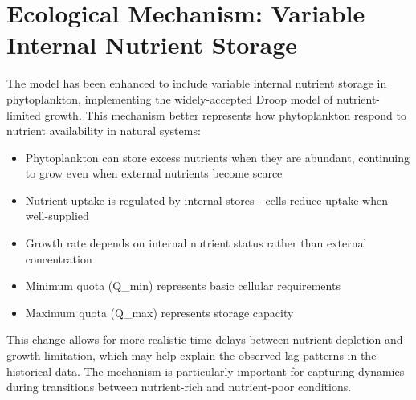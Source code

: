 \section{Ecological Mechanism: Variable Internal Nutrient Storage}

The model has been enhanced to include variable internal nutrient storage in phytoplankton, implementing the widely-accepted Droop model of nutrient-limited growth. This mechanism better represents how phytoplankton respond to nutrient availability in natural systems:

\begin{itemize}
    \item Phytoplankton can store excess nutrients when they are abundant, continuing to grow even when external nutrients become scarce
    \item Nutrient uptake is regulated by internal stores - cells reduce uptake when well-supplied
    \item Growth rate depends on internal nutrient status rather than external concentration
    \item Minimum quota (Q_min) represents basic cellular requirements
    \item Maximum quota (Q_max) represents storage capacity
\end{itemize}

This change allows for more realistic time delays between nutrient depletion and growth limitation, which may help explain the observed lag patterns in the historical data. The mechanism is particularly important for capturing dynamics during transitions between nutrient-rich and nutrient-poor conditions.
